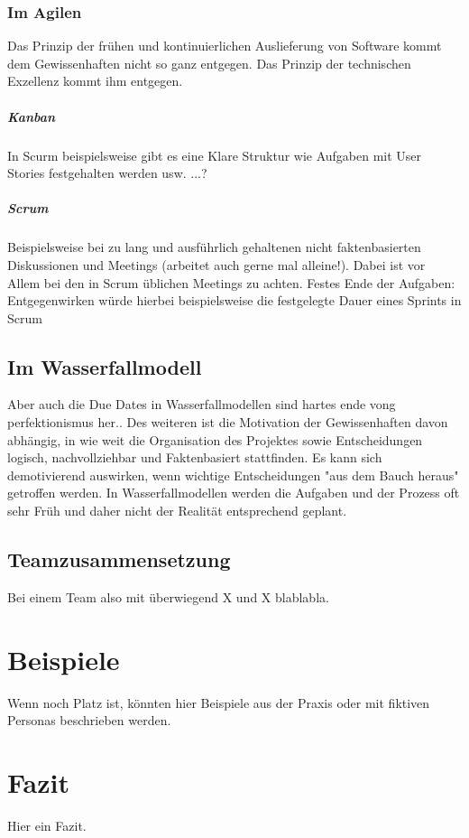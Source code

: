 \documentclass[twocolumn,10pt]{asme2ej}
\begin{document}
\subsubsection{Im Agilen}
Das Prinzip der frühen und kontinuierlichen Auslieferung von Software kommt dem Gewissenhaften nicht so ganz entgegen. Das Prinzip der technischen Exzellenz kommt ihm entgegen. 
\subparagraph{Kanban}
In Scurm beispielsweise gibt es eine Klare Struktur wie Aufgaben mit User Stories festgehalten werden usw. ...?
\subparagraph{Scrum}
Beispielsweise bei zu lang und ausführlich gehaltenen nicht faktenbasierten Diskussionen und Meetings (arbeitet auch gerne mal alleine!). Dabei ist vor Allem bei den in Scrum üblichen Meetings zu achten. Festes Ende der Aufgaben: Entgegenwirken würde hierbei beispielsweise die festgelegte Dauer eines Sprints in Scrum

\subsection{Im Wasserfallmodell}
Aber auch die Due Dates in Wasserfallmodellen sind hartes ende vong perfektionismus her.. Des weiteren ist die Motivation der Gewissenhaften davon abhängig, in wie weit die Organisation des Projektes sowie Entscheidungen logisch, nachvollziehbar und Faktenbasiert stattfinden. Es kann sich demotivierend auswirken, wenn wichtige Entscheidungen "aus dem Bauch heraus" getroffen werden. In Wasserfallmodellen werden die Aufgaben und der Prozess oft sehr Früh und daher nicht der Realität entsprechend geplant. 

\cite{disc_pm}
\subsection{Teamzusammensetzung}
Bei einem Team also mit überwiegend X und X blablabla.

\section{Beispiele}
Wenn noch Platz ist, könnten hier Beispiele aus der Praxis oder mit fiktiven Personas beschrieben werden.

\section{Fazit}
Hier ein Fazit.




\end{document}
